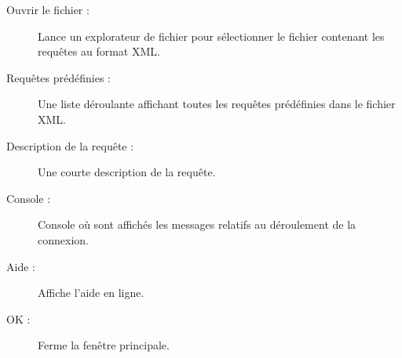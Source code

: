
\begin{description}
\item[Ouvrir le fichier :] Lance un explorateur de fichier pour sélectionner le fichier contenant les requêtes au format XML.
\item[Requêtes prédéfinies :] Une liste déroulante affichant toutes les requêtes prédéfinies dans le fichier XML.
\item[Description de la requête :] Une courte description de la requête.
\item[Console :] Console où sont affichés les messages relatifs au déroulement de la connexion.
\item[Aide :] Affiche l'aide en ligne.
\item[OK :] Ferme la fenêtre principale.
\end{description}

\label{evis_xml_format}


